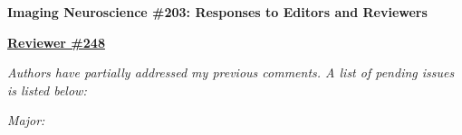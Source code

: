 \documentclass[a4paper,11pt,twoside]{report}
\begin{document}
\begin{center}
	{\large\textbf{Imaging Neuroscience \#203: Responses to Editors and Reviewers}}
\end{center}





\noindent \underline{\textbf{Reviewer \#248}}

\textit{Authors have partially addressed my previous comments. A list of pending issues is listed below:}

\vspace{1em}

\noindent \textit{Major:}
\end{document}
